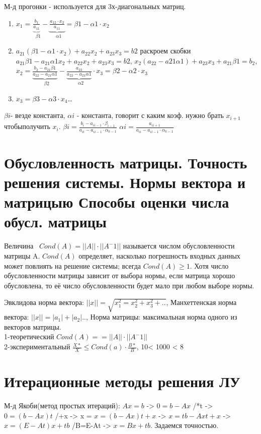 \documentclass{article}
\begin{document}
М-д прогонки - используется для 3х-диагональных матриц.
\begin{enumerate}
  \item $ x_1 
  = \underbrace{\frac{b_1}{a_{11}}}_\text{ $\beta 1$} 
  - \underbrace{\frac{a_{12} \cdot x_2}{a_{11}}}_\text{ $\alpha 1$} 
  = \beta 1 - \alpha 1 \cdot x_2$
  \item $a_{21}(\beta 1 - \alpha 1 \cdot x_2) + a_{22}x_2 + a_{23}x_3=b2$
  раскроем скобки $a_{21}\beta{1} - a_{21} \alpha{1} x_2 + a_{22}x_2 +
  a_{23}x_3=b2$, 
  $x_2(a_{22} - a{21}\alpha{1}) + a_{23}x_3 + a_{21}\beta{1} = b_2$,
  $x_2 = \underbrace{\frac{b_2 - a_{21}\beta{1}}{a_{22} - a_{21}\alpha{1}}}_\text{ $\beta 2$}
  - \underbrace{\frac{a_{23}}{a_{22} - a_{21}\alpha{1}}}_\text{ $\alpha 2$}\cdot x_3 
  = \beta{2} - \alpha{2} \cdot x_3$
  \item  $x_3 = \beta{3} -\alpha{3} \cdot x_4$\ldots
\end{enumerate}
$\beta{i} $- везде константа, $\alpha{i}$ - константа, говорит с каким коэф.
нужно брать $x_{i+1}$ чтобыполучить $x_{i}$.
$\beta{i} = \frac{b_i - a_{ii-1} \cdot \beta_{i-1}}{a_{ii} - a_{ii-1} \cdot \alpha_{k-1}}$
$\alpha{i} = \frac{a_{ii+1}}{a_{ii} - a_{ii-1} \cdot \alpha_{k-1}}$

\section{Обусловленность матрицы. Точность решения системы. Нормы вектора и матрицыю Способы оценки числа обусл. матрицы}
Величина  $Cond(A) = ||A|| \cdot ||A^-1||$ называется числом обусловленности
матрицы A. $Cond(A)$ определяет, насколько погрешность входных
данных может повлиять на решение системы; всегда $Cond(A) \geq 1$. Хотя число
обусловленности матрицы зависит от выбора нормы, если матрица хорошо обусловлена, то её число
обусловленности будет мало при любом выборе нормы.

Эвклидова норма вектора: $||x|| = \sqrt{x_1^2 = x_2^2 + x_3^2 + ..}$,
Манхеттенская норма вектора: $||x|| = |a_1| + |a_2| ..$,
Норма матрицы: максимальная норма одного из векторов матрицы.\\
1-теоретический $Cond(A) = = ||A|| \cdot ||A^-1||$\\
2-экспериментальный $\frac{X*}{X} \leq Cond(a) \cdot \frac{B*}{B}$, 
10< 1000 < 8

\section{Итерационные методы решения ЛУ}
М-д Якоби(метод простых итераций): $Ax = b$ -> $0 = b- Ax$ /*t -> 
$0=(b-Ax)t $ /+x -> x = $x=(b-Ax)t + x$ -> $x = tb - Axt + x$ ->
$x = (E - At)x + tb $ /B=E-At -> $x = Bx + tb$. Задаемся точностью.
\end{document}
